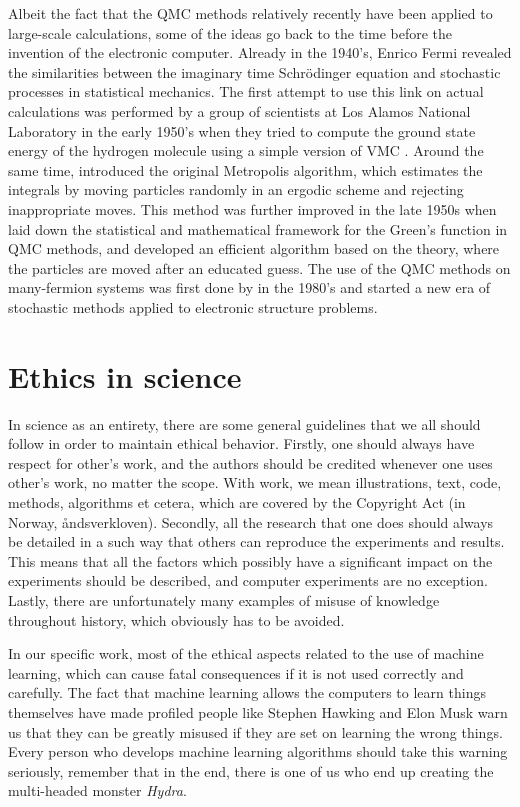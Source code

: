 Albeit the fact that the QMC methods relatively recently have been applied to large-scale calculations, some of the ideas go back to the time before the invention of the electronic computer. Already in the 1940's, Enrico Fermi revealed the similarities between the imaginary time Schrödinger equation and stochastic processes in statistical mechanics. The first attempt to use this link on actual calculations was performed by a group of scientists at Los Alamos National Laboratory in the early 1950's when they tried to compute the ground state energy of the hydrogen molecule using a simple version of VMC \cite{bajdich_electronic_2010}. Around the same time, \citet{metropolis_monte_1949} introduced the original Metropolis algorithm, which estimates the integrals by moving particles randomly in an ergodic scheme and rejecting inappropriate moves. This method was further improved in the late 1950s when \citet{KALOS1979153} laid down the statistical and mathematical framework for the Green's function in QMC methods, and \citet{hastings_monte_1970} developed an efficient algorithm based on the theory, where the particles are moved after an educated guess. The use of the QMC methods on many-fermion systems was first done by \citet{ceperley_quantum_1986} in the 1980's and started a new era of stochastic methods applied to electronic structure problems. 

\section{Ethics in science}
In science as an entirety, there are some general guidelines that we all should follow in order to maintain ethical behavior. Firstly, one should always have respect for other's work, and the authors should be credited whenever one uses other's work, no matter the scope. With work, we mean illustrations, text, code, methods, algorithms et cetera, which are covered by the Copyright Act (in Norway, åndsverkloven). Secondly, all the research that one does should always be detailed in a such way that others can reproduce the experiments and results. This means that all the factors which possibly have a significant impact on the experiments should be described, and computer experiments are no exception. Lastly, there are unfortunately many examples of misuse of knowledge throughout history, which obviously has to be avoided.

In our specific work, most of the ethical aspects related to the use of machine learning, which can cause fatal consequences if it is not used correctly and carefully. The fact that machine learning allows the computers to learn things themselves have made profiled people like Stephen Hawking \cite{cellan-jones_hawking:_2014} and Elon Musk \cite{vance_elon_2015} warn us that they can be greatly misused if they are set on learning the wrong things. Every person who develops machine learning algorithms should take this warning seriously, remember that in the end, there is one of us who end up creating the multi-headed monster \textit{Hydra}.

